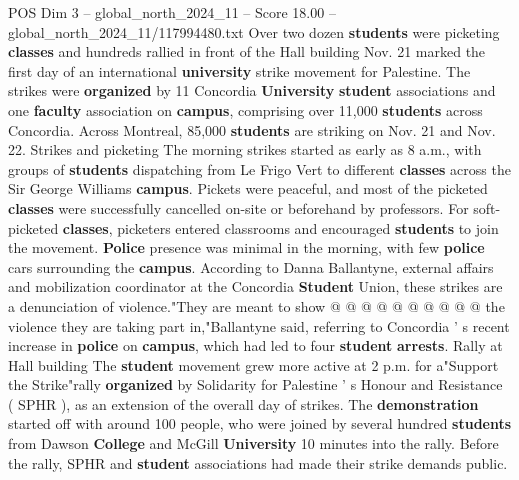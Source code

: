\begin{textsample}{POS Dim 3 – global\_north\_2024\_11 – Score 18.00 – global\_north\_2024\_11/117994480.txt}  \label{ex:f3_pos_169}
Over two dozen \textbf{students} were picketing \textbf{classes} and hundreds rallied in front of the Hall building Nov. 21 marked the first day of an international \textbf{university} strike movement for Palestine.
The strikes were \textbf{organized} by 11 Concordia \textbf{University} \textbf{student} associations and one \textbf{faculty} association on \textbf{campus}, comprising over 11,000 \textbf{students} across Concordia.
Across Montreal, 85,000 \textbf{students} are striking on Nov. 21 and Nov. 22.
Strikes and picketing The morning strikes started as early as 8 a.m., with groups of \textbf{students} dispatching from Le Frigo Vert to different \textbf{classes} across the Sir George Williams \textbf{campus}.
Pickets were peaceful, and most of the picketed \textbf{classes} were successfully cancelled on-site or beforehand by professors.
For soft-picketed \textbf{classes}, picketers entered classrooms and encouraged \textbf{students} to join the movement. \textbf{Police} presence was minimal in the morning, with few \textbf{police} cars surrounding the \textbf{campus}.
According to Danna Ballantyne, external affairs and mobilization coordinator at the Concordia \textbf{Student} Union, these strikes are a denunciation of violence."They are meant to show @ @ @ @ @ @ @ @ @ @ the violence they are taking part in,"Ballantyne said, referring to Concordia ' s recent increase in \textbf{police} on \textbf{campus}, which had led to four \textbf{student} \textbf{arrests}.
Rally at Hall building The \textbf{student} movement grew more active at 2 p.m. for a"Support the Strike"rally \textbf{organized} by Solidarity for Palestine ' s Honour and Resistance ( SPHR ), as an extension of the overall day of strikes.
The \textbf{demonstration} started off with around 100 people, who were joined by several hundred \textbf{students} from Dawson \textbf{College} and McGill \textbf{University} 10 minutes into the rally.
Before the rally, SPHR and \textbf{student} associations had made their strike demands public.

\end{textsample}
